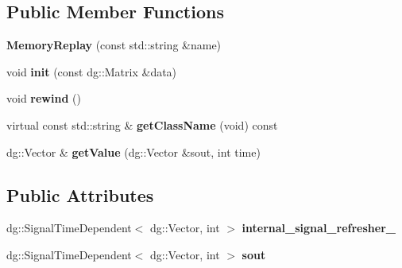 \subsection*{Public Member Functions}
\begin{DoxyCompactItemize}
\item 
{\bfseries Memory\+Replay} (const std\+::string \&name)\hypertarget{classdg__tools_1_1MemoryReplay_a8337a556eae14b1f8259487c0ab79b31}{}\label{classdg__tools_1_1MemoryReplay_a8337a556eae14b1f8259487c0ab79b31}

\item 
void {\bfseries init} (const dg\+::\+Matrix \&data)\hypertarget{classdg__tools_1_1MemoryReplay_a6fabc46d90fc14020e3122638528a3c4}{}\label{classdg__tools_1_1MemoryReplay_a6fabc46d90fc14020e3122638528a3c4}

\item 
void {\bfseries rewind} ()\hypertarget{classdg__tools_1_1MemoryReplay_a659c4c6d6a053d4a62ddd3593dba2c23}{}\label{classdg__tools_1_1MemoryReplay_a659c4c6d6a053d4a62ddd3593dba2c23}

\item 
virtual const std\+::string \& {\bfseries get\+Class\+Name} (void) const \hypertarget{classdg__tools_1_1MemoryReplay_a0bb7c62a85661716411924aa0a9dad51}{}\label{classdg__tools_1_1MemoryReplay_a0bb7c62a85661716411924aa0a9dad51}

\item 
dg\+::\+Vector \& {\bfseries get\+Value} (dg\+::\+Vector \&sout, int time)\hypertarget{classdg__tools_1_1MemoryReplay_a8ab59d0192c29bc4701171276f8d3e67}{}\label{classdg__tools_1_1MemoryReplay_a8ab59d0192c29bc4701171276f8d3e67}

\end{DoxyCompactItemize}
\subsection*{Public Attributes}
\begin{DoxyCompactItemize}
\item 
dg\+::\+Signal\+Time\+Dependent$<$ dg\+::\+Vector, int $>$ {\bfseries internal\+\_\+signal\+\_\+refresher\+\_\+}\hypertarget{classdg__tools_1_1MemoryReplay_a2d096c1d9ab01da6af070141de32a1ad}{}\label{classdg__tools_1_1MemoryReplay_a2d096c1d9ab01da6af070141de32a1ad}

\item 
dg\+::\+Signal\+Time\+Dependent$<$ dg\+::\+Vector, int $>$ {\bfseries sout}\hypertarget{classdg__tools_1_1MemoryReplay_a2a7e1605201f102754dbb9d79b14a79d}{}\label{classdg__tools_1_1MemoryReplay_a2a7e1605201f102754dbb9d79b14a79d}

\end{DoxyCompactItemize}
